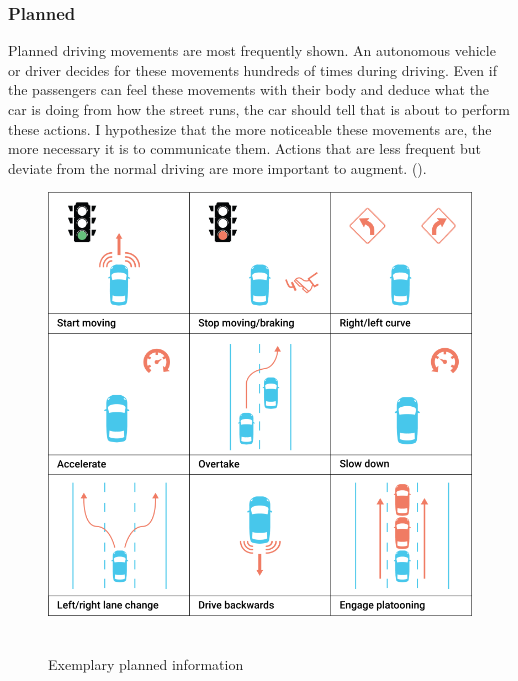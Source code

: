 \subsubsection{Planned}
Planned driving movements are most frequently shown. An autonomous vehicle or driver decides for these movements hundreds of times during driving. Even if the passengers can feel these movements with their body and deduce what the car is doing from how the street runs, the car should tell that is about to perform these actions. I hypothesize that the more noticeable these movements are, the more necessary it is to communicate them. Actions that are less frequent but deviate from the normal driving are more important to augment. (\emph{}). 
\begin{figure}
    \includegraphics[width=1\textwidth]{fig/planned_1366.png}\hfill\
    \caption[Planned information]{Exemplary planned information}
    \label{fig:planned}
\end{figure}

